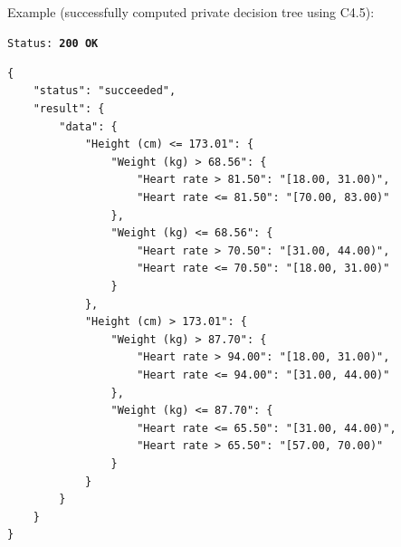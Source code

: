 \begin{itemize}
\begin{description}[labelwidth=4em, leftmargin=\dimexpr\labelwidth+\labelsep\relax]
\ \\
\begin{minipage}{\linewidth}
  Example (successfully computed private decision tree using C4.5):\\
{
\texttt{Status: {\color{ForestGreen}\textbf{200 OK}}}
\begin{verbatim}
{
    "status": "succeeded",
    "result": {
        "data": {
            "Height (cm) <= 173.01": {
                "Weight (kg) > 68.56": {
                    "Heart rate > 81.50": "[18.00, 31.00)",
                    "Heart rate <= 81.50": "[70.00, 83.00)"
                },
                "Weight (kg) <= 68.56": {
                    "Heart rate > 70.50": "[31.00, 44.00)",
                    "Heart rate <= 70.50": "[18.00, 31.00)"
                }
            },
            "Height (cm) > 173.01": {
                "Weight (kg) > 87.70": {
                    "Heart rate > 94.00": "[18.00, 31.00)",
                    "Heart rate <= 94.00": "[31.00, 44.00)"
                },
                "Weight (kg) <= 87.70": {
                    "Heart rate <= 65.50": "[31.00, 44.00)",
                    "Heart rate > 65.50": "[57.00, 70.00)"
                }
            }
        }
    }
}
\end{verbatim}
\label{sc:get-response-sucessful-3}
}
\end{minipage}


\end{description}
\end{itemize}
